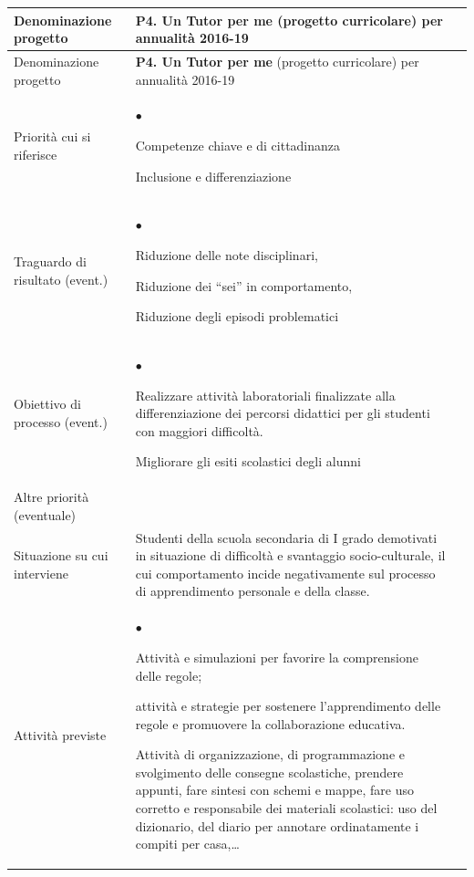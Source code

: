\documentclass[12pt,a4paper,oneside]{memoir}
\newenvironment{elenco}{\begin{list}{$\bullet$}{%
              \setlength{\leftmargin}{4mm}%
              \setlength{\rightmargin}{1mm}%
               \setlength{\itemindent}{0mm}%
               \setlength{\labelwidth}{2mm}%
               \setlength{\labelsep}{2mm}%
              \setlength{\itemsep}{-\parsep}%
              \setlength{\partopsep}{0pt}%
              \setlength{\topsep}{0pt}%
             \setlength{\parskip}{0pt}%
              }}{\end{list}}
\begin{document}
\clearpage

\begin{footnotesize}
\begin{longtable}{|>{\raggedright}p{2.5cm}|>{\raggedright\arraybackslash}P{10cm}|}
\hline
{}
\label{P4}Denominazione progetto&\textbf{P4. Un Tutor per me} (progetto curricolare) per annualità 2016-19\\ \hline \endfirsthead
\hline
{}
Denominazione progetto&\textbf{P4. Un Tutor per me} (progetto curricolare) per annualità 2016-19\\ \hline \endhead
{}
\endfoot
\hline
\endlastfoot
Priorità cui si riferisce&\begin{elenco}
\item Competenze chiave e di cittadinanza
\item Inclusione e differenziazione
\end{elenco}\\[-4mm] \hline
Traguardo di risultato (event.)&
\begin{elenco}
\item Riduzione delle note disciplinari, 
\item Riduzione dei ``sei'' in comportamento, 
\item Riduzione degli episodi problematici
\end{elenco}\\[-4mm] \hline
Obiettivo di processo (event.)&
\begin{elenco}
\item Realizzare attività laboratoriali finalizzate alla differenziazione dei percorsi didattici per gli studenti con maggiori difficoltà.
\item Migliorare gli esiti scolastici degli alunni
\end{elenco}\\[-4mm] \hline
Altre priorità (eventuale)&\\ \hline
Situazione su cui interviene&Studenti della scuola secondaria di I grado demotivati in situazione di difficoltà e svantaggio socio-culturale, il cui comportamento incide negativamente sul processo di apprendimento personale e della classe.\\ \hline
Attività previste&
\begin{elenco}
\item Attività e simulazioni per favorire la comprensione delle regole;
\item attività e strategie per sostenere l'apprendimento delle regole e promuovere la collaborazione educativa. \item Attività di organizzazione, di programmazione e svolgimento delle consegne scolastiche, prendere appunti, fare sintesi con schemi e mappe, fare uso corretto e responsabile dei materiali scolastici: uso del dizionario, del diario per annotare ordinatamente i compiti per casa,\ldots

\end{elenco}
\end{longtable}
\end{footnotesize}
\end{document}
